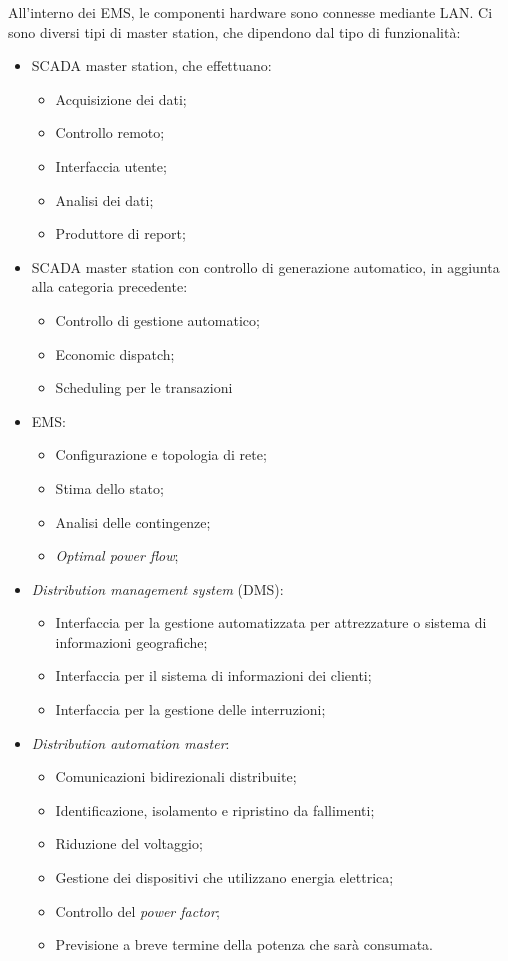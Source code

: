 All'interno dei EMS, le componenti hardware sono connesse mediante LAN. Ci sono diversi tipi di master station, che dipendono dal tipo di funzionalità:
\begin{itemize}
	\item SCADA master station, che effettuano:
	\begin{itemize}
		\item Acquisizione dei dati;
		\item Controllo remoto;
		\item Interfaccia utente;
		\item Analisi dei dati;
		\item Produttore di report;
	\end{itemize}
	\item SCADA master station con controllo di generazione automatico, in aggiunta alla categoria precedente:
	\begin{itemize}
		\item Controllo di gestione automatico;
		\item Economic dispatch;
		\item Scheduling per le transazioni
	\end{itemize}
	\item EMS:
	\begin{itemize}
		\item Configurazione e topologia di rete;
		\item Stima dello stato;
		\item Analisi delle contingenze;
		\item \emph{Optimal power flow};
	\end{itemize}
	\item \emph{Distribution management system} (DMS):
	\begin{itemize}
		\item Interfaccia per la gestione automatizzata per attrezzature o sistema di informazioni geografiche;
		\item Interfaccia per il sistema di informazioni dei clienti;
		\item Interfaccia per la gestione delle interruzioni;
	\end{itemize}	 
	\item \emph{Distribution automation master}:
	\begin{itemize}
		\item Comunicazioni bidirezionali distribuite;
		\item Identificazione, isolamento e ripristino da fallimenti;
		\item Riduzione del voltaggio;
		\item Gestione dei dispositivi che utilizzano energia elettrica;
		\item Controllo del \emph{power factor};
		\item Previsione a breve termine della potenza che sarà consumata.
	\end{itemize}
\end{itemize} 

